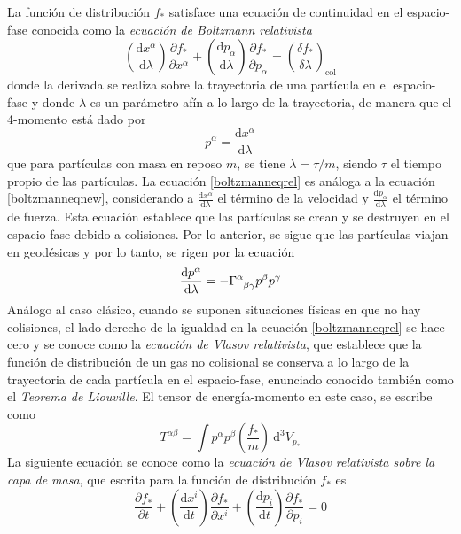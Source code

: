 \documentclass[11pt,twoside,openright,spanish]{report}
\numberwithin{equation}{chapter}
\numberwithin{figure}{chapter}
\numberwithin{table}{chapter}
\begin{document}
\newpage
La función de distribución $f_*$ satisface una ecuación de continuidad en el espacio-fase conocida como la \textit{ecuación de Boltzmann relativista}
\begin{equation}
\left(\frac{\text{d}x^\alpha}{\text{d}\lambda}\right)\frac{\partial f_*}{\partial x^\alpha}+\left(\frac{\text{d}p_\alpha}{\text{d}\lambda}\right)\frac{\partial f_*}{\partial p_\alpha}=\left(\frac{\delta f_*}{\delta \lambda}\right)_{\text{col}}
\label{boltzmanneqrel}
\end{equation}
donde la derivada se realiza sobre la trayectoria de una partícula en el espacio-fase y donde $\lambda$ es un parámetro afín a lo largo de la trayectoria, de manera que el 4-momento está dado por
\begin{equation}
p^\alpha=\frac{\text{d}x^\alpha}{\text{d}\lambda}
\end{equation}
que para partículas con masa en reposo $m$, se tiene $\lambda=\tau/m$, siendo $\tau$ el tiempo propio de las partículas. La ecuación \eqref{boltzmanneqrel} es análoga a la ecuación \eqref{boltzmanneqnew}, considerando a $\frac{\text{d}x^\alpha}{\text{d}\lambda}$ el término de la velocidad y $\frac{\text{d}p_\alpha}{\text{d}\lambda}$ el término de fuerza. Esta ecuación establece que las partículas se crean y se destruyen en el espacio-fase debido a colisiones. Por lo anterior, se sigue que las partículas viajan en geodésicas y por lo tanto, se rigen por la ecuación
\begin{equation}
\frac{\text{d}p^\alpha}{\text{d}\lambda}=-\tensor{\Gamma}{^\alpha_\beta_\gamma}p^\beta p^\gamma
\end{equation}
Análogo al caso clásico, cuando se suponen situaciones físicas en que no hay colisiones, el lado derecho de la igualdad en la ecuación \eqref{boltzmanneqrel} se hace cero y se conoce como la \textit{ecuación de Vlasov relativista}, que establece que la función de distribución de un gas no colisional se conserva a lo largo de la trayectoria de cada partícula en el espacio-fase, enunciado conocido también como el \textit{Teorema de Liouville}. El tensor de energía-momento en este caso, se escribe como
\begin{equation}
T^{\alpha\beta}=\int p^\alpha p^\beta\left(\frac{f_*}{m}\right)\ \text{d}^3V_{p_*}
\label{tensenergmomentof}
\end{equation}
La siguiente ecuación se conoce como la \textit{ecuación de Vlasov relativista sobre la capa de masa}, que escrita para la función de distribución $f_*$ es 
\begin{equation}
\frac{\partial f_*}{\partial t}+\left(\frac{\text{d}x^i}{\text{d}t}\right)\frac{\partial f_*}{\partial x^i}+\left(\frac{\text{d}p_i}{\text{d}t}\right)\frac{\partial f_*}{\partial p_i}=0
\label{vlasovreal}
\end{equation}
\end{document}
